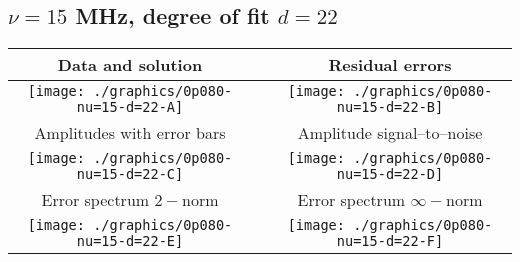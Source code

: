 

% 

\clearpage{}
\break{}

\subsection{$\nu = 15$ MHz, degree of fit $d = 22$}

\begin{table}[h]
    \begin{center}
        \begin{tabular}{ccc}
            Data and solution & \quad & Residual errors \\\hline
            \texttt{[image: ./graphics/0p080-nu=15-d=22-A]} &&
            \texttt{[image: ./graphics/0p080-nu=15-d=22-B]} \\[15pt]
            Amplitudes with error bars && Amplitude signal--to--noise \\\hline
            \texttt{[image: ./graphics/0p080-nu=15-d=22-C]} &&
            \texttt{[image: ./graphics/0p080-nu=15-d=22-D]} \\[15pt]
            Error spectrum $2-$norm && Error spectrum $\infty-$norm \\\hline
            \texttt{[image: ./graphics/0p080-nu=15-d=22-E]} &&
            \texttt{[image: ./graphics/0p080-nu=15-d=22-F]} \\[15pt]
        \end{tabular}
    \end{center}
\label{fig:elev=80, nu=15}
\end{table}



\endinput
